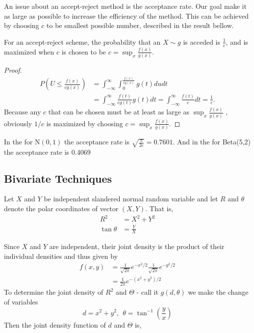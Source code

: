 An issue about an accept-reject method is the acceptance rate.
Our goal make it as large as possible to increase the efficiency of the method.
This can be achieved by choosing $c$ to be smallest possible number, described in the result bellow.
\begin{theorem}
	For an accept-reject scheme, the probability that an $X\sim g$ is acceded is  $\frac{1}{c}$,
	and is maximized when $c$ is chosen to be $c=\sup_x\frac{f(x)}{g(x)}.$
\end{theorem}
\begin{proof}
	\begin{align*}
		P\left( U \le \frac{f(x)}{cg(x)} \right) & = \int_{-\infty}^{\infty} \int_{0}^{\frac{f(x)}{cg(x)}} g(t) du dt                                           \\
		                                         & = \int_{-\infty}^{\infty} \frac{f(t)}{cg(t)}g(t)dt = \int_{-\infty}^{\infty} \frac{f(t)}{c}dt = \frac{1}{c}.
	\end{align*}
	Because any $c$ that can be chosen must be at least as large as $\sup_x\frac{f(x)}{g(x)}$
	, obviously $1/c$ is maximized by choosing $c=\sup_x\frac{f(x)}{g(x)}.$
\end{proof}

In the  for $\text{N}(0,1)$ the acceptance rate is $\sqrt{\frac{\pi}{2 e}} = 0.7601$.
And in the  for Beta(5,2) the acceptance rate is 0.4069

\subsection{Bivariate Techniques}
Let $X$ and $Y$ be independent slandered normal random variable and let $R$ and $\theta$
denote the polar coordinates of vector $(X,Y)$. That is,
\begin{align*}
	R^{2}       & = X^{2} + Y^2 \\
	\tan \theta & = \frac{Y}{X}
\end{align*}

Since $X$ and $Y$ are independent, their joint density is the product of their individual densities and thus given by
\begin{align*}
	f(x,y) & = \frac{1}{\sqrt{2\pi}} e^{-x^{2}/2 } \frac{1}{\sqrt{2\pi}} e^{-y^{2}/2 } \\
	       & = \frac{1}{2\pi} e^{-(x^{2}+y^{2})/2}
\end{align*}
To determine the joint density of $R^{2} $ and $\Theta$ - call it $g(d,\theta)$ we make the change of variables
\[
	d=x^{2}+y^{2}, \ \  \theta=\tan^{-1}\left( \frac{y}{x} \right)
\]
Then the joint density function of $d $ and $\Theta$ is,

